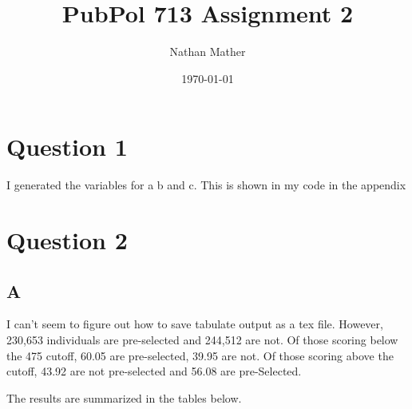 \documentclass[11pt]{article}
\title{PubPol 713 Assignment 2} %
\author{Nathan Mather} %
\date{\today} %
\begin{document}
	
\maketitle %

\setcounter{tocdepth}{2} %


\section{ Question 1}

I generated the variables for a b and c. This is shown in my code in the appendix 


\section{ Question 2}

\subsection{A}
I can't seem to figure out how to save tabulate output as a tex file. However, 230,653 individuals are pre-selected and 244,512 are not. Of those scoring below the 475 cutoff, 60.05 are pre-selected, 39.95 are not.  Of those scoring above the cutoff, 43.92 are not pre-selected and 56.08 are pre-Selected. 

The results are summarized in the tables below. 

\begin{center}
	\begin{tabular}{||c | c||} 
		\hline		
		
		\hline
		
	\end{tabular}
\end{center}


\begin{center}
	\begin{tabular}{||c | c | c| c||} 
		\hline
		
		
		\hline
		
	\end{tabular}
\end{center}
\end{document}
